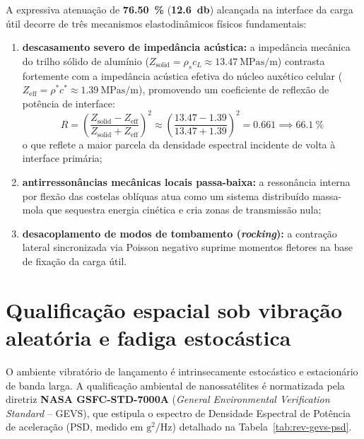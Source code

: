 A expressiva atenuação de \textbf{\SI{76.50}{\percent}} (\textbf{\SI{12.6}{\decibel}}) alcançada na interface da carga útil decorre de três mecanismos elastodinâmicos físicos fundamentais:
\begin{enumerate}
  \item \textbf{descasamento severo de impedância acústica:} a impedância mecânica do trilho sólido de alumínio ($Z_{\text{solid}} = \rho_s c_L \approx \SI{13.47}{\mega\pascal\second\per\metre}$) contrasta fortemente com a impedância acústica efetiva do núcleo auxético celular ($Z_{\text{eff}} = \rho^* c^* \approx \SI{1.39}{\mega\pascal\second\per\metre}$), promovendo um coeficiente de reflexão de potência de interface:
  \begin{equation}
    R = \left( \frac{Z_{\text{solid}} - Z_{\text{eff}}}{Z_{\text{solid}} + Z_{\text{eff}}} \right)^2 \approx \left( \frac{\num{13.47} - \num{1.39}}{\num{13.47} + \num{1.39}} \right)^2 = \num{0.661} \implies \SI{66.1}{\percent}
    \label{eq:reflexao-potencia}
  \end{equation}
  o que reflete a maior parcela da densidade espectral incidente de volta à interface primária;
  \item \textbf{antirressonâncias mecânicas locais passa-baixa:} a ressonância interna por flexão das costelas oblíquas atua como um sistema distribuído massa-mola que sequestra energia cinética e cria zonas de transmissão nula;
  \item \textbf{desacoplamento de modos de tombamento (\textit{rocking}):} a contração lateral sincronizada via Poisson negativo suprime momentos fletores na base de fixação da carga útil.
\end{enumerate}

\section{Qualificação espacial sob vibração aleatória e fadiga estocástica}
\label{sec:rev-vibra-alea}

O ambiente vibratório de lançamento é intrinsecamente estocástico e estacionário de banda larga. A qualificação ambiental de nanossatélites é normatizada pela diretriz \textbf{NASA GSFC-STD-7000A} (\textit{General Environmental Verification Standard} -- GEVS), que estipula o espectro de Densidade Espectral de Potência de aceleração (PSD, medido em $\text{g}^2/\text{Hz}$) detalhado na Tabela~\ref{tab:rev-gevs-psd}.

